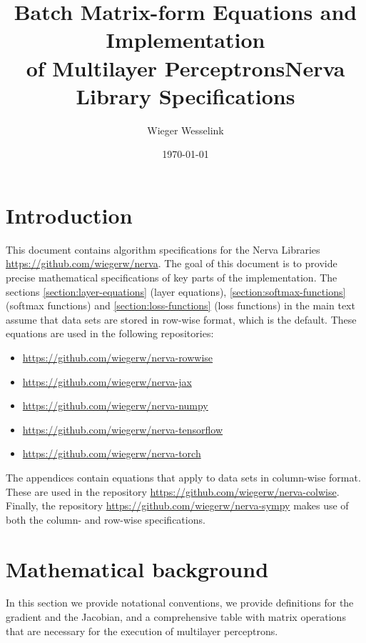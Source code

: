 \documentclass{article}
\begin{document}
\title{\centering Batch Matrix-form Equations and Implementation \\ of Multilayer Perceptrons}

\title{Nerva Library Specifications}
\author{Wieger Wesselink}
\date{\today}

\maketitle

\tableofcontents

\section{Introduction}
This document contains algorithm specifications for the Nerva Libraries \url{https://github.com/wiegerw/nerva}. The goal of this document is to provide precise mathematical specifications of key parts of the implementation. The sections 
\ref{section:layer-equations} (layer equations), 
\ref{section:softmax-functions} (softmax functions)
and \ref{section:loss-functions} (loss functions) in the main text
assume that data sets are stored in row-wise format, which is the default. These equations are used in the following repositories:
\begin{itemize}
    \item \url{https://github.com/wiegerw/nerva-rowwise}
    \item \url{https://github.com/wiegerw/nerva-jax}
    \item \url{https://github.com/wiegerw/nerva-numpy}
    \item \url{https://github.com/wiegerw/nerva-tensorflow}
    \item \url{https://github.com/wiegerw/nerva-torch}
\end{itemize}
The appendices contain equations that apply to data sets in column-wise format. These are used in the repository \url{https://github.com/wiegerw/nerva-colwise}. Finally, the repository \url{https://github.com/wiegerw/nerva-sympy} makes use of both the column- and row-wise specifications.

\section{Mathematical background} \label{section:mathematical-background}
In this section we provide notational conventions, we provide definitions for the gradient and the Jacobian, and a comprehensive table with matrix operations that are necessary for the execution of multilayer perceptrons.
\end{document}
